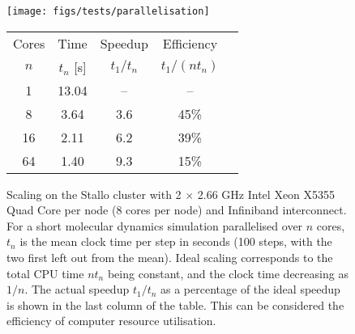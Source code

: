 \documentclass[11pt,bibliography=totoc,index=totoc]{scrbook}   %
\begin{document}





\begin{figure}[htp]
  \begin{minipage}[c]{7.5cm}
      \texttt{[image: figs/tests/parallelisation]} %
  \end{minipage}
  \begin{minipage}[c]{5cm}
    \begin{tabular}[b]{ccccc}\toprule
        Cores  & Time & Speedup & Efficiency \\
        $n$    & $t_n$ [s] & $t_1/t_n$ & $t_1/(nt_n)$ \\\midrule
        1      & 13.04     & –         & –            \\
        8      & 3.64      & 3.6       & 45\%         \\
        16     & 2.11      & 6.2       & 39\%         \\
        64     & 1.40      & 9.3       & 15\%         \\\bottomrule
    \end{tabular}
  \end{minipage}
  \caption{Scaling on the Stallo cluster with 2 $\times$ 2.66 GHz Intel Xeon X5355 Quad Core per node (8 cores per node) and Infiniband interconnect.
      For a short molecular dynamics simulation parallelised over $n$ cores, $t_n$ is the mean clock time per step in seconds (100 steps, with the two first left out from the mean).
      Ideal scaling corresponds to the total CPU time $nt_n$ being constant, and the clock time decreasing as $1/n$. 
      The actual speedup $t_1/t_n$ as a percentage of the ideal speedup is shown in the last column of the table.
      This can be considered the efficiency of computer resource utilisation.
  }
  \label{fig:scaling}
\end{figure}


\end{document}
